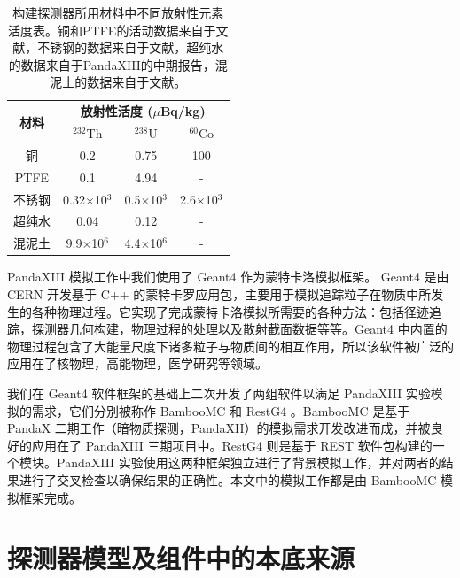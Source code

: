 \renewcommand\arraystretch{1.4}
\begin{table}[tbh]
    \centering
    \begin{tabular*}{0.75\textwidth}{@{\extracolsep{\fill}}cccc}
        \hline
        \hline
        \multirow{2}{*}{\textbf{材料}} & \multicolumn{3}{c}{\textbf{放射性活度 ($\mu$Bq/kg)}}\\
            & $^{232}$Th & $^{238}$U  & $^{60}$Co \\ \hline
        铜      & 0.2        &   0.75     &     100     \\
        PTFE    & 0.1        &   4.94      &    -      \\
        不锈钢  & 0.32$\times$10$^3$          &    0.5$\times$10$^3$      &     2.6$\times$10$^3$     \\
        超纯水  & 0.04          &     0.12      &     -     \\
        混泥土  & 9.9$\times$10$^6$          &    4.4$\times$10$^6$   &    -    \\
        \hline
        \hline
    \end{tabular*}
    \caption{构建探测器所用材料中不同放射性元素活度表。铜和PTFE的活动数据来自于文献\cite{Abgrall:2016cct}，不锈钢的数据来自于文献\cite{LZ_CDR}，超纯水的数据来自于PandaXIII的中期报告\cite{cdr}，混泥土的数据来自于文献\cite{Zeng2014}。}
    \label{tab:activities}
  \end{table}
  

PandaXIII 模拟工作中我们使用了 Geant4 作为蒙特卡洛模拟框架。 Geant4 是由 CERN 开发基于 C++ 的蒙特卡罗应用包，主要用于模拟追踪粒子在物质中所发生的各种物理过程。它实现了完成蒙特卡洛模拟所需要的各种方法：包括径迹追踪，探测器几何构建，物理过程的处理以及散射截面数据等等。Geant4 中内置的物理过程包含了大能量尺度下诸多粒子与物质间的相互作用，所以该软件被广泛的应用在了核物理，高能物理，医学研究等领域。

我们在 Geant4 软件框架的基础上二次开发了两组软件以满足 PandaXIII 实验模拟的需求，它们分别被称作 BambooMC 和 RestG4 。BambooMC 是基于 PandaX 二期工作（暗物质探测，PandaXII）的模拟需求开发改进而成，并被良好的应用在了 PandaXIII 三期项目中。RestG4 则是基于 REST \supercite{tomas2013development} 软件包构建的一个模块。PandaXIII 实验使用这两种框架独立进行了背景模拟工作，并对两者的结果进行了交叉检查以确保结果的正确性。本文中的模拟工作都是由 BambooMC 模拟框架完成。

\section{探测器模型及组件中的本底来源}

